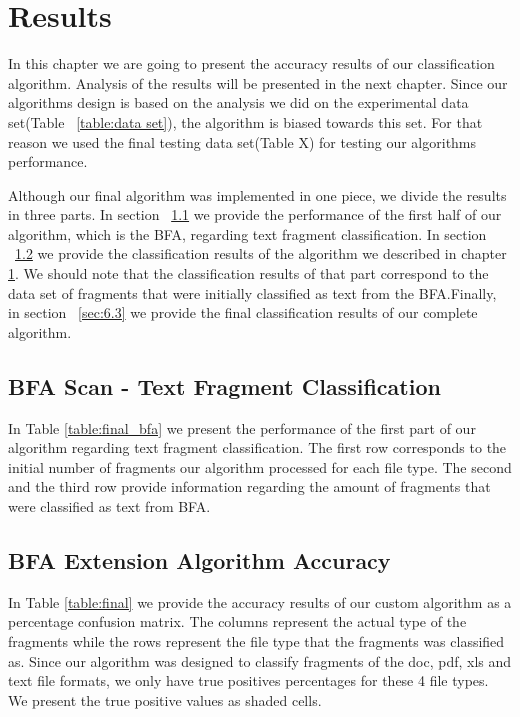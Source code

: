 \chapter{Results}\label{chap:6}
In this chapter we are going to present the accuracy results of our classification algorithm. Analysis of the results will be presented in the next chapter.
Since our algorithms design is based on the analysis we did on the experimental data set(Table ~\ref{table:data set}), the algorithm is biased towards this set. For that reason we used the final testing data set(Table X) for testing our algorithms performance.

Although our final algorithm was implemented in one piece, we divide the results in three parts. In section ~\ref{sec:6.1} we  provide the performance of the first half of our algorithm, which is the BFA, regarding text fragment classification. In section ~\ref{sec:6.2} we provide the classification results of the algorithm we described in chapter \ref{chap:6}. We should note that the classification results of that part correspond to the data set of fragments that were initially classified as text from the BFA.Finally, in section ~\ref{sec:6.3} we provide the final classification results of our complete algorithm. 
\pagebreak

\section{BFA Scan - Text Fragment Classification}\label{sec:6.1}
In Table \ref{table:final_bfa} we present the performance of the first part of our algorithm regarding text fragment classification. The first row corresponds to the initial number of fragments our algorithm processed for each file type. The second and the third row provide information regarding the amount of fragments that were classified as text from BFA.





\section{BFA Extension Algorithm Accuracy}\label{sec:6.2}
In Table \ref{table:final} we provide the accuracy results of our custom  algorithm as a percentage confusion matrix. The columns represent the actual type of the fragments while the rows represent the file type that the fragments was classified as. Since our algorithm was designed to classify fragments of the doc, pdf, xls and text file formats, we only have true positives percentages for these 4 file types. We present the true positive values as shaded cells.

